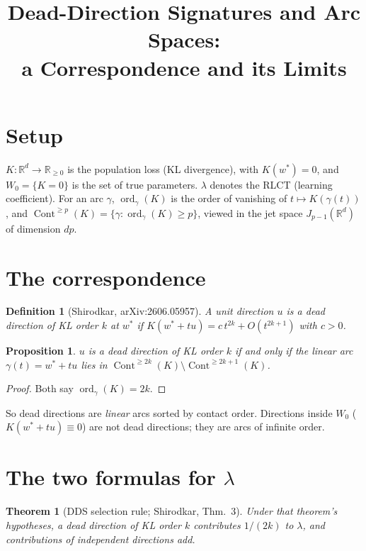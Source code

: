 \documentclass[11pt]{article}
\title{Dead-Direction Signatures and Arc Spaces:\\ a Correspondence and its Limits}
\author{}
\date{}
\newtheorem{defn}{Definition}
\newtheorem{thm}{Theorem}
\newtheorem{prop}{Proposition}
\newcommand{\Cont}{\operatorname{Cont}}
\begin{document}
\maketitle
\thispagestyle{empty}

\section*{Setup}

$K : \mathbb{R}^d \to \mathbb{R}_{\geq 0}$ is the population loss (KL divergence), with
$K(w^*) = 0$, and $W_0 = \{K = 0\}$ is the set of true parameters. $\lambda$ denotes the
RLCT (learning coefficient). For an arc $\gamma$, $\operatorname{ord}_\gamma(K)$ is the
order of vanishing of $t \mapsto K(\gamma(t))$, and
$\Cont^{\geq p}(K) = \{\gamma : \operatorname{ord}_\gamma(K) \geq p\}$, viewed in the jet
space $J_{p-1}(\mathbb{R}^d)$ of dimension $dp$.

\section*{The correspondence}

\begin{defn}[Shirodkar, arXiv:2606.05957]
A unit direction $u$ is a \emph{dead direction of KL order $k$} at $w^*$ if
$K(w^* + tu) = c\,t^{2k} + O(t^{2k+1})$ with $c > 0$.
\end{defn}

\begin{prop}
$u$ is a dead direction of KL order $k$ if and only if the linear arc
$\gamma(t) = w^* + tu$ lies in $\Cont^{\geq 2k}(K) \setminus \Cont^{\geq 2k+1}(K)$.
\end{prop}
\begin{proof}
Both say $\operatorname{ord}_\gamma(K) = 2k$.
\end{proof}

So dead directions are \emph{linear} arcs sorted by contact order. Directions inside
$W_0$ ($K(w^*+tu) \equiv 0$) are not dead directions; they are arcs of infinite order.

\section*{The two formulas for $\lambda$}

\begin{thm}[DDS selection rule; Shirodkar, Thm.~3]
Under that theorem's hypotheses, a dead direction of KL order $k$ contributes
$1/(2k)$ to $\lambda$, and contributions of independent directions add.
\end{thm}
\end{document}
